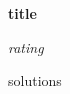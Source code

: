 \documentclass[16pt]{article}
\begin{document}
\begin{center}
    \textbf{\LARGE{ {{ title }} }}
\end{center}

\vspace{0.1cm}

\begin{center}
    \textit{ {{ rating }}}
\end{center}

\vspace{0.25cm}

\begin{multicols}{3}
\begin{enumerate}
{{ solutions }}
\end{enumerate}
\end{multicols}
\end{document}
